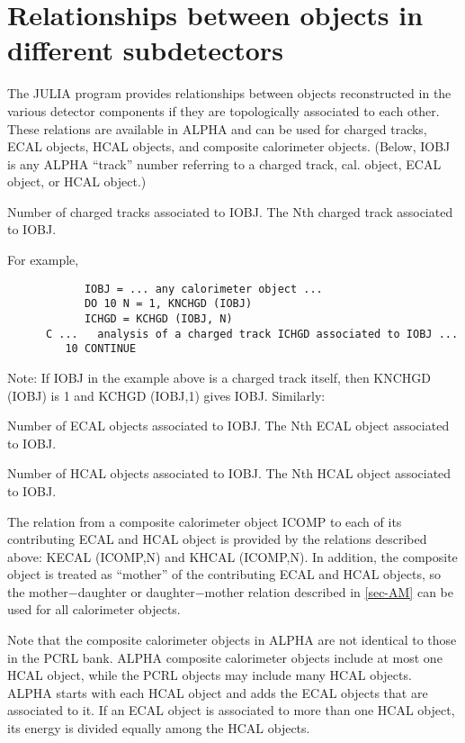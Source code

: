 \section{\label{sec-AR}Relationships between objects in different
subdetectors}
\par
The JULIA program provides relationships between objects reconstructed
in the various detector components if they are topologically
associated to each other. These relations are available in ALPHA and
can be used for charged tracks, ECAL objects, HCAL objects, and
composite calorimeter
objects. (Below, IOBJ is any ALPHA ``track'' number referring
to a charged track, cal.
object, ECAL object, or HCAL object.)
\begin{indentlist}{ 3.50cm}{ 3.75cm}
Number of charged tracks associated to IOBJ.
The Nth charged track associated to IOBJ.
\end{indentlist}
For example,
\begin{verbatim}
            IOBJ = ... any calorimeter object ...
            DO 10 N = 1, KNCHGD (IOBJ)
            ICHGD = KCHGD (IOBJ, N)
      C ...   analysis of a charged track ICHGD associated to IOBJ ...
         10 CONTINUE
\end{verbatim}
Note: If IOBJ in the example above is a charged track itself, then
KNCHGD (IOBJ) is 1 and KCHGD (IOBJ,1) gives IOBJ.
Similarly:
\begin{indentlist}{ 3.50cm}{ 3.75cm}
Number of ECAL objects associated to IOBJ.
The Nth ECAL object associated to IOBJ.
 
Number of HCAL objects associated to IOBJ.
The Nth HCAL object associated to IOBJ.
\end{indentlist}
\par
The relation from a composite calorimeter object ICOMP to each
of its contributing ECAL and HCAL object is provided by
the relations described above: KECAL (ICOMP,N) and KHCAL (ICOMP,N).
In addition, the composite object is treated as ``mother'' of the
contributing ECAL and HCAL objects, so the mother$-$daughter or
daughter$-$mother relation described in
\ref{sec-AM} can be used for all calorimeter objects.
\par Note that the composite calorimeter
objects in ALPHA are not identical to those in the PCRL bank.  ALPHA
composite calorimeter objects include at most one HCAL object, while the
PCRL
objects may include many HCAL objects.  ALPHA starts with each HCAL
object and adds the ECAL objects that are associated to it.
If an ECAL object is
associated to more than one HCAL object, its energy is divided equally
among the HCAL objects.

